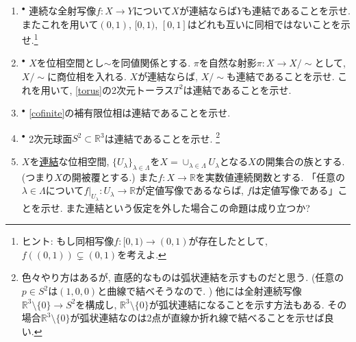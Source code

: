 \documentclass[dvipdfmx,a4paper,11pt]{article}
\newcommand{\R}{\mathbb{R}}
\newcommand{\C}{\mathbb{C}}
\theoremstyle{definition}
\begin{document}
\begin{enumerate}[label=\textbf{問}\ref*{sec-connected}.\arabic*]
	\setlength{\parskip}{0cm} 
  \setlength{\itemsep}{7pt} 


\item \label{connected_conti}$^{\bullet}$ 連続な全射写像$f: X \rightarrow Y$について$X$が連結ならば$Y$も連結であることを示せ. またこれを用いて$(0,1)$, $[0,1)$, $[0,1]$はどれも互いに同相ではないことを示せ.\footnote{ヒント: もし同相写像$f : [0,1) \to (0,1)$が存在したとして, $f((0,1)) \subsetneq (0,1)$を考えよ.}


\item $^{\bullet}$ $X$を位相空間とし$\sim$を同値関係とする. $\pi$を自然な射影$\pi : X\to X/\sim $として, $X/\sim$に商位相を入れる. $X$が連結ならば, $X/\sim$も連結であることを示せ. これを用いて, \ref{torus}の2次元トーラス$T^2$は連結であることを示せ. 

\item $^{\bullet}$ \ref{cofinite}の補有限位相は連結であることを示せ.

\item $^\bullet$  2次元球面$S^2 \subset \R^3$は連結であることを示せ. \footnote{色々やり方はあるが, 直感的なものは弧状連結を示すものだと思う. (任意の$p \in S^2$は$(1,0,0)$と曲線で結べそうなので. ) 他には全射連続写像$\R^3 \setminus \{ 0\} \to S^2$を構成し, $\R^3 \setminus \{ 0\} $が弧状連結になることを示す方法もある. その場合$\R^3 \setminus \{ 0\} $が弧状連結なのは2点が直線か折れ線で結べることを示せば良い.}

\item $X$を\underline{連結}な位相空間, $\{ U_{\lambda}\}_{\lambda \in \Lambda}$を$X=\cup_{\lambda \in \Lambda}U_{\lambda}$となる$X$の開集合の族とする.(つまり$X$の開被覆とする.) また$f : X \to \R$を実数値連続関数とする.
「任意の$\lambda \in \Lambda$について$f|_{U_{\lambda}} : U_{\lambda} \to \R$が定値写像であるならば, $f$は定値写像である」ことを示せ. また連結という仮定を外した場合この命題は成り立つか?



\end{enumerate}
\end{document}
